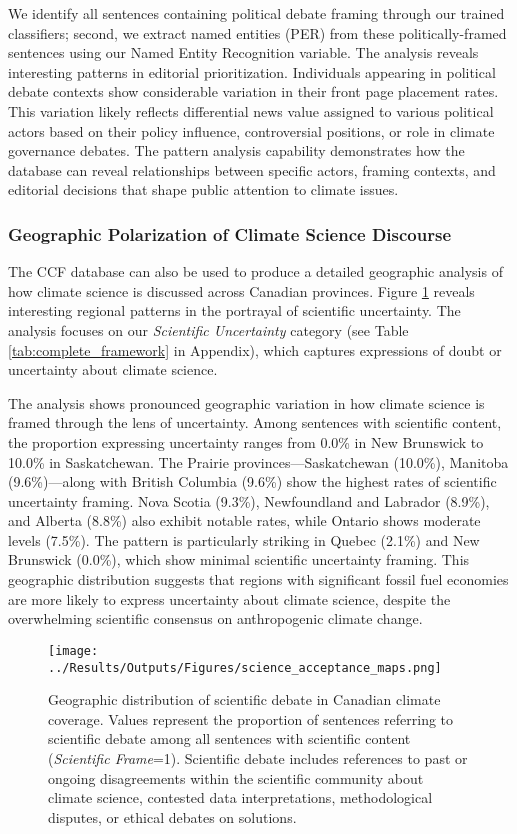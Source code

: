 \documentclass[12pt]{article}
\begin{document}
We identify all sentences containing political debate framing through our trained classifiers; second, we extract named entities (PER) from these politically-framed sentences using our Named Entity Recognition variable. The analysis reveals interesting patterns in editorial prioritization. Individuals appearing in political debate contexts show considerable variation in their front page placement rates. This variation likely reflects differential news value assigned to various political actors based on their policy influence, controversial positions, or role in climate governance debates. The pattern analysis capability demonstrates how the database can reveal relationships between specific actors, framing contexts, and editorial decisions that shape public attention to climate issues.

\subsubsection{Geographic Polarization of Climate Science Discourse}

The CCF database can also be used to produce a detailed geographic analysis of how climate science is discussed across Canadian provinces. Figure \ref{fig:science_acceptance} reveals interesting regional patterns in the portrayal of scientific uncertainty. The analysis focuses on our \emph{Scientific Uncertainty} category (see Table \ref{tab:complete_framework} in Appendix), which captures expressions of doubt or uncertainty about climate science.

The analysis shows pronounced geographic variation in how climate science is framed through the lens of uncertainty. Among sentences with scientific content, the proportion expressing uncertainty ranges from 0.0\% in New Brunswick to 10.0\% in Saskatchewan. The Prairie provinces—Saskatchewan (10.0\%), Manitoba (9.6\%)—along with British Columbia (9.6\%) show the highest rates of scientific uncertainty framing. Nova Scotia (9.3\%), Newfoundland and Labrador (8.9\%), and Alberta (8.8\%) also exhibit notable rates, while Ontario shows moderate levels (7.5\%). The pattern is particularly striking in Quebec (2.1\%) and New Brunswick (0.0\%), which show minimal scientific uncertainty framing. This geographic distribution suggests that regions with significant fossil fuel economies are more likely to express uncertainty about climate science, despite the overwhelming scientific consensus on anthropogenic climate change.

\begin{figure}[t]
\centering
\texttt{[image: ../Results/Outputs/Figures/science\_acceptance\_maps.png]}
\caption{Geographic distribution of scientific debate in Canadian climate coverage. Values represent the proportion of sentences referring to scientific debate among all sentences with scientific content (\emph{Scientific Frame}=1). Scientific debate includes references to past or ongoing disagreements within the scientific community about climate science, contested data interpretations, methodological disputes, or ethical debates on solutions.}
\label{fig:science_acceptance}
\end{figure}
\end{document}
